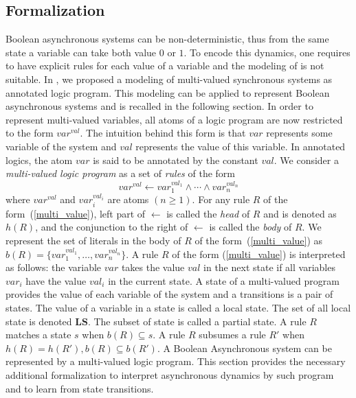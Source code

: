 \subsection{Formalization}
    
	Boolean asynchronous systems can be non-deterministic, thus from the same state a variable can take both value $0$ or $1$.
	To encode this dynamics, one requires to have explicit rules for each value of a variable and the modeling of \cite{ribeiro2015learning} is not suitable.
	In \cite{DMTRICLP15}, we proposed a modeling of multi-valued synchronous systems as annotated logic program.
    This modeling can be applied to represent Boolean asynchronous systems and is recalled in the following section.
	In order to represent multi-valued variables, all atoms of a logic program are now restricted to the form $var^{val}$.
	The intuition behind this form is that $var$ represents some variable of the system and $val$ represents the value of this variable.
	In annotated logics, the atom $var$ is said to be annotated by the constant $val$.
	We consider a {\it multi-valued logic program\/} as a set of {\it rules\/} of the form  
	\begin{equation}\label{multi_value}
		var^{val} \leftarrow var_1^{val_1} \wedge \cdots \wedge var_n^{val_n}
	\end{equation}
	where $var^{val}$ and $var_i^{val_i}$ are atoms $(n \geq 1)$.
	For any rule $R$ of the form~(\ref{multi_value}), left part of $\leftarrow$ is called the {\it head\/} of $R$ and is denoted as $h(R)$,
	and the conjunction to the right of $\leftarrow$ is called the {\it body\/} of $R$.  
	We represent the set of literals in the body of $R$ of the form~(\ref{multi_value}) as $b(R)=\{var_1^{val_1},\ldots,var_n^{val_n}\}$. 
	A rule $R$ of the form (\ref{multi_value}) is interpreted as follows:
	the variable $var$ takes the value $val$ in the next state if all variables $var_i$ have the value $val_i$ in the current state.
	A state of a multi-valued program provides the value of each variable of the system and a transitions is a pair of states.
	The value of a variable in a state is called a local state.
	The set of all local state is denoted $\mathbf{LS}$.
	The subset of state is called a partial state.
	A rule $R$ matches a state $s$ when $b(R) \subseteq s$.
	A rule $R$ subsumes a rule $R'$ when $h(R)=h(R'), b(R) \subseteq b(R')$.
%
A Boolean Asynchronous system can be represented by a multi-valued logic program.
This section provides the necessary additional formalization to interpret asynchronous dynamics by such program and to learn from state transitions.

